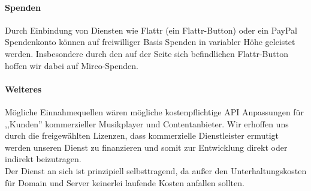 \paragraph{Spenden} Durch Einbindung von Diensten wie Flattr (ein
Flattr-Button) oder ein PayPal Spendenkonto können auf freiwilliger Basis
Spenden in variabler Höhe geleistet werden. Insbesondere durch den auf der Seite
sich befindlichen Flattr-Button hoffen wir dabei auf Mirco-Spenden.
\\
\paragraph{Weiteres} Mögliche Einnahmequellen wären mögliche kostenpflichtige API
Anpassungen für ,,Kunden'' kommerzieller Musikplayer und Contentanbieter. Wir
erhoffen uns durch die freigewählten Lizenzen, dass kommerzielle Dienstleister
ermutigt werden unseren Dienst zu finanzieren und somit zur Entwicklung direkt
oder indirekt beizutragen.
\\
Der Dienst an sich ist prinzipiell selbsttragend, da außer den
Unterhaltungskosten für Domain und Server keinerlei laufende Kosten anfallen sollten.
